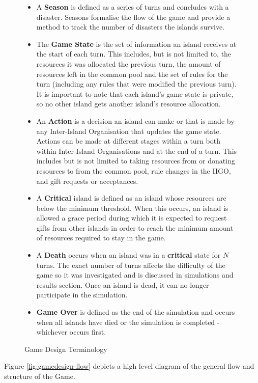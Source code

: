 \begin{figure}[!htb]
\begin{itemize}
\begin{enumerate}
\begin{itemize}
                    \end{itemize}
            \end{enumerate}        
        \item A \textbf{Season} is defined as a series of turns and concludes with a disaster. Seasons formalise the flow of the game and provide a method to track the number of disasters the islands survive.
        \item The \textbf{Game State} is the set of information an island receives at the start of each turn. This includes, but is not limited to, the resources it was allocated the previous turn, the amount of resources left in the common pool and the set of rules for the turn (including any rules that were modified the previous turn). It is important to note that each island's game state is private, so no other island gets another island's resource allocation. 
        \item An \textbf{Action} is a decision an island can make or that is made by any Inter-Island Organisation that updates the game state. Actions can be made at different stages within a turn both within Inter-Island Organisations and at the end of a turn. This includes but is not limited to taking resources from or donating resources to from the common pool, rule changes in the IIGO, and gift requests or acceptances. 
        \item A \textbf{Critical} island is defined as an island whose resources are below the minimum threshold. When this occurs, an island is allowed a grace period during which it is expected to request gifts from other islands in order to reach the minimum amount of resources required to stay in the game.
        \item A \textbf{Death} occurs when an island was in a \textbf{critical} state for $N$ turns. The exact number of turns affects the difficulty of the game so it was investigated and is discussed in simulations and results section. Once an island is dead, it can no longer participate in the simulation.
        \item \textbf{Game Over} is defined as the end of the simulation and occurs when all islands have died or the simulation is completed - whichever occurs first.
    \end{itemize}
    \caption{Game Design Terminology}
    \label{fig:gamedesign-terminology}
\end{figure}

Figure \ref{fig:gamedesign-flow} depicts a high level diagram of the general flow and structure of the Game. 

